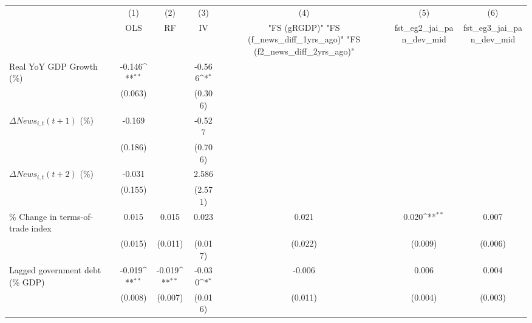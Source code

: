 {
\def\sym#1{\ifmmode^{#1}\else\(^{#1}\)\fi}
\begin{tabular}{l*{6}{c}}
\toprule
                    &\multicolumn{1}{c}{(1)}&\multicolumn{1}{c}{(2)}&\multicolumn{1}{c}{(3)}&\multicolumn{1}{c}{(4)}&\multicolumn{1}{c}{(5)}&\multicolumn{1}{c}{(6)}\\
                    &\multicolumn{1}{c}{OLS}&\multicolumn{1}{c}{RF}&\multicolumn{1}{c}{IV}&\multicolumn{1}{c}{ "FS (gRGDP)"  "FS (f_news_diff_1yrs_ago)"  "FS (f2_news_diff_2yrs_ago)" }&\multicolumn{1}{c}{fst_eg2_jai_pan_dev_mid}&\multicolumn{1}{c}{fst_eg3_jai_pan_dev_mid}\\
\midrule
Real YoY GDP Growth (\%)&      -0.146\sym{**} &                     &      -0.566\sym{*}  &                     &                     &                     \\
                    &     (0.063)         &                     &     (0.306)         &                     &                     &                     \\
\addlinespace
$ \Delta News_{i,t}(t+1)$ (\%)&      -0.169         &                     &      -0.527         &                     &                     &                     \\
                    &     (0.186)         &                     &     (0.706)         &                     &                     &                     \\
\addlinespace
$ \Delta News_{i,t}(t+2)$ (\%)&      -0.031         &                     &       2.586         &                     &                     &                     \\
                    &     (0.155)         &                     &     (2.571)         &                     &                     &                     \\
\addlinespace
\% Change in terms-of-trade index&       0.015         &       0.015         &       0.023         &       0.021         &       0.020\sym{**} &       0.007         \\
                    &     (0.015)         &     (0.011)         &     (0.017)         &     (0.022)         &     (0.009)         &     (0.006)         \\
\addlinespace
Lagged government debt (\% GDP)&      -0.019\sym{**} &      -0.019\sym{**} &      -0.030\sym{*}  &      -0.006         &       0.006         &       0.004         \\
                    &     (0.008)         &     (0.007)         &     (0.016)         &     (0.011)         &     (0.004)         &     (0.003)         \\

\end{tabular}}
